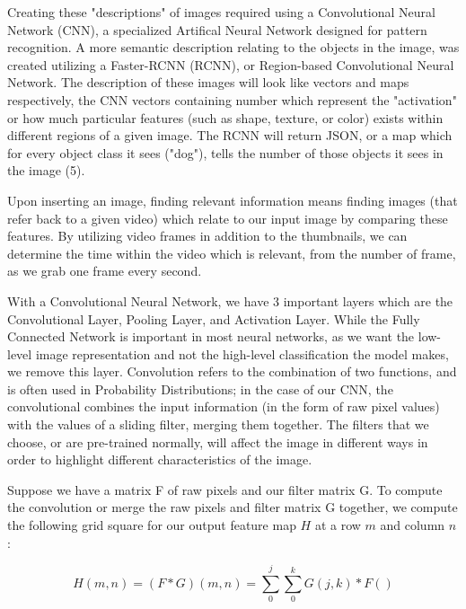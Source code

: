 \documentclass[10pt,twocolumn]{article}
\begin{document}
Creating these "descriptions" of images required using a Convolutional Neural Network (CNN), a specialized Artifical Neural Network designed for pattern recognition. A more semantic description relating to the objects in the image, was created utilizing a Faster-RCNN (RCNN), or Region-based Convolutional Neural Network. The description of these images will look like vectors and maps respectively, the CNN vectors containing number which represent the "activation" or how much particular features (such as shape, texture, or color) exists within different regions of a given image. The RCNN will return JSON, or a map which for every object class it sees ("dog"), tells the number of those objects it sees in the image (5).

Upon inserting an image, finding relevant information means finding images (that refer back to a given video) which relate to our input image by comparing these features. By utilizing video frames in addition to the thumbnails, we can determine the time within the video which is relevant, from the number of frame, as we grab one frame every second.

With a Convolutional Neural Network, we have 3 important layers which are the Convolutional Layer, Pooling Layer, and Activation Layer. While the Fully Connected Network is important in most neural networks, as we want the low-level image representation and not the high-level classification the model makes, we remove this layer. Convolution refers to the combination of two functions, and is often used in Probability Distributions; in the case of our CNN, the convolutional combines the input information (in the form of raw pixel values) with the values of a sliding filter, merging them together. The filters that we choose, or are pre-trained normally, will affect the image in different ways in order to highlight different characteristics of the image. 

Suppose we have a matrix F of raw pixels and our filter matrix G. To compute the convolution or merge the raw pixels and filter matrix G together, we compute the following grid square for our output feature map $H$ at a row $m$ and column $n$:

\[ H(m, n)  =  (F * G)(m, n) = \sum_{0}^{j} \sum_{0}^{k} G(j, k) * F() \]
\end{document}
